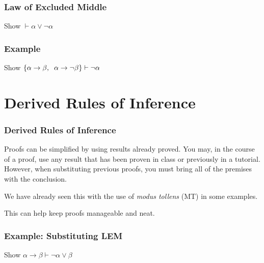 \documentclass{beamer}
\theoremstyle{indentDefn} \newtheorem{defn}[]{Definition}
\begin{document}
\begin{frame}
	\frametitle{Law of Excluded Middle}
	
	Show $\vdash \alpha \lor \lnot \alpha$
	\vspace{7cm}
	
\end{frame}

\begin{frame}
	\frametitle{Example}
	Show $\{\alpha \rightarrow \beta, \hspace{0.2cm} \alpha \rightarrow \lnot\beta\} \vdash \lnot\alpha$
	\vspace{7cm}
	
	
	
\end{frame}

\section{Derived Rules of Inference}

\begin{frame}
	\frametitle{Derived Rules of Inference}
	
	Proofs can be simplified by using results already proved. You may, in the course of a proof, use any result that has been proven in class or previously in a tutorial. However, when substituting previous proofs, you must bring all of the premises with the conclusion. 
	
	\vspace{0.5cm}
	
	We have already seen this with the use of \emph{modus tollens} (MT) in some examples.
	
	\vspace{0.5cm} 
	
	This can help keep proofs manageable and neat.

\end{frame}

\begin{frame}
	\frametitle{Example: Substituting LEM}
	
	Show $\alpha \rightarrow \beta \vdash \lnot\alpha \lor \beta$
	
	\vspace{7cm}
		
	
\end{frame}
\end{document}
